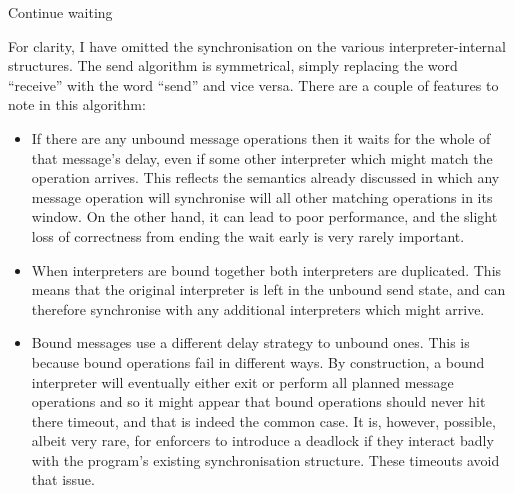 \begin{algorithmic}[1]
      \Else
        \State Continue waiting
      \EndIf
    \EndFor
  \EndWhile

    \EndIf
       
    \Else
    \EndIf
  \EndFor
\end{algorithmic}

For clarity, I have omitted the synchronisation on the various
interpreter-internal structures.  The send algorithm is symmetrical,
simply replacing the word ``receive'' with the word ``send'' and vice
versa.  There are a couple of features to note in this algorithm:

\begin{itemize}
\item
  If there are any unbound message operations then it waits for the
  whole of that message's delay, even if some other interpreter which
  might match the operation arrives.  This reflects the semantics
  already discussed in which any message operation will synchronise
  will all other matching operations in its window.  On the other
  hand, it can lead to poor performance, and the slight loss of
  correctness from ending the wait early is very rarely important.
\item
  When interpreters are bound together both interpreters are
  duplicated.  This means that the original interpreter is left in the
  unbound send state, and can therefore synchronise with any
  additional interpreters which might arrive.
\item
  Bound messages use a different delay strategy to unbound ones.  This
  is because bound operations fail in different ways.  By
  construction, a bound interpreter will eventually either exit or
  perform all planned message operations and so it might appear that
  bound operations should never hit there timeout, and that is indeed
  the common case.  It is, however, possible, albeit very rare, for
  {\technique} enforcers to introduce a deadlock if they interact
  badly with the program's existing synchronisation structure.  These
  timeouts avoid that issue.  
\end{itemize}

